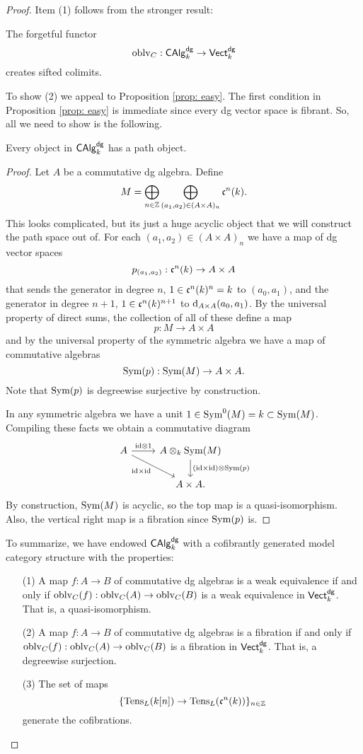 \documentclass[11pt]{amsart}
\begin{document}
\begin{proof}
Item (1) follows from the stronger result:

\begin{lem}
The forgetful functor 
\[
{\rm oblv}_C : {\sf CAlg}^{\sf dg}_k \to {\sf Vect}^{\sf dg}_k
\]
creates sifted colimits.
\end{lem}

To show (2) we appeal to Proposition \ref{prop: easy}. 
The first condition in Proposition \ref{prop: easy} is immediate since every dg vector space is fibrant. 
So, all we need to show is the following. 

\begin{lem}
Every object in ${\sf CAlg}^{\sf dg}_k$ has a path object.
\end{lem}
\begin{proof}
Let $A$ be a commutative dg algebra. 
Define
\[
M = \bigoplus_{n \in \mathbb Z} \bigoplus_{(a_1,a_2) \in (A \times A)_n} \mathfrak c^n(k) .
\]
This looks complicated, but its just a huge acyclic object that we will construct the path space out of. 
For each $(a_1,a_2) \in (A \times A)_n$ we have a map of dg vector spaces
\[
p_{(a_1,a_2)} : \mathfrak c^n(k) \to A \times A
\]
that sends the generator in degree $n$, $1 \in \mathfrak c^n(k)^n = k$ to $(a_0,a_1)$, and the generator in degree $n+1$, $1 \in \mathfrak c^n(k)^{n+1}$ to ${\rm d}_{A \times A} (a_0, a_1)$. 
By the universal property of direct sums, the collection of all of these define a map
\[
p : M \to A \times A
\]
and by the universal property of the symmetric algebra we have a map of commutative algebras
\[
{\rm Sym}(p) : {\rm Sym}(M) \to A \times A .
\]
Note that ${\rm Sym}(p)$ is degreewise surjective by construction. 

In any symmetric algebra we have a unit $1 \in {\rm Sym}^0(M) = k \subset {\rm Sym}(M)$. 
Compiling these facts we obtain a commutative diagram
\[
\begin{tikzcd}
A \ar[r, "\id \tensor 1"] \ar[dr, "\id \times \id"'] & A \tensor_k \Sym(M) \ar[d, "(\id \times \id) \tensor \Sym(p)"] \\
& A \times A .
\end{tikzcd}
\]
By construction, ${\rm Sym}(M)$ is acyclic, so the top map is a quasi-isomorphism. 
Also, the vertical right map is a fibration since ${\rm Sym}(p)$ is. 
\end{proof}

To summarize, we have endowed ${\sf CAlg}^{\sf dg}_k$ with a cofibrantly generated model category structure with the properties:
\begin{itemize}
\item[(1)] A map $f : A \to B$ of commutative dg algebras is a weak equivalence if and only if ${\rm oblv}_C(f) : {\rm oblv}_C(A) \to {\rm oblv}_C(B)$ is a weak equivalence in ${\sf Vect}^{\sf dg}_k$.
That is, a quasi-isomorphism. 
\item[(2)] A map $f : A \to B$ of commutative dg algebras is a fibration if and only if ${\rm oblv}_C(f) : {\rm oblv}_C(A) \to {\rm oblv}_C(B)$ is a fibration in ${\sf Vect}^{\sf dg}_k$.
That is, a degreewise surjection. 
\item[(3)] The set of maps
\[
\{{\rm Tens}_L(k[n]) \to {\rm Tens}_L (\mathfrak c^n(k))\}_{n \in \mathbb Z}
\]
generate the cofibrations. 
\end{itemize}



\end{proof}
\end{document}
